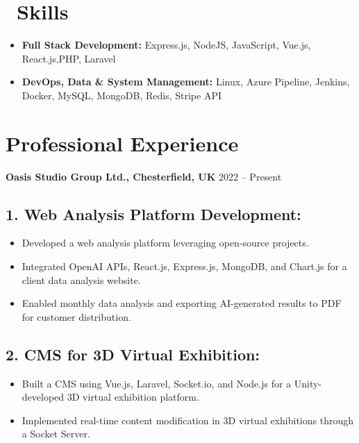 \documentclass{resume}
\begin{document}



\section{\faCogs\ Skills}
\begin{itemize}[parsep=0.5ex]
  \item \textbf{Full Stack Development:} Express.js, NodeJS, JavaScript, Vue.js, React.js,PHP, Laravel
  \item \textbf{DevOps, Data \& System Management:} Linux, Azure Pipeline, Jenkins, Docker, MySQL, MongoDB, Redis, Stripe API
\end{itemize}


\section*{Professional Experience}

\textbf{Oasis Studio Group Ltd., Chesterfield, UK} \hfill 2022 -- Present

\subsection*{1. Web Analysis Platform Development:}
\begin{itemize}[noitemsep]
    \item Developed a web analysis platform leveraging open-source projects.
    \item Integrated OpenAI APIs, React.js, Express.js, MongoDB, and Chart.js for a client data analysis website.
    \item Enabled monthly data analysis and exporting AI-generated results to PDF for customer distribution.
\end{itemize}

\subsection*{2. CMS for 3D Virtual Exhibition:}
\begin{itemize}[noitemsep]
    \item Built a CMS using Vue.js, Laravel, Socket.io, and Node.js for a Unity-developed 3D virtual exhibition platform.
    \item Implemented real-time content modification in 3D virtual exhibitions through a Socket Server.
\end{itemize}
\end{document}
